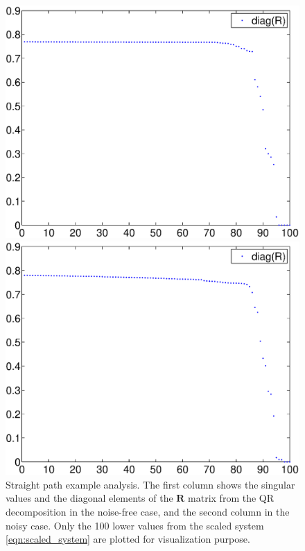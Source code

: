 \begin{figure}[t]
\begin{minipage}{.492\columnwidth}
  \includegraphics[width=\columnwidth]
    {fig/straight-path-noisefree-spqr-scaled.eps}
\end{minipage}
\begin{minipage}{.492\columnwidth}
  \centering
  \includegraphics[width=\columnwidth]
    {fig/straight-path-spqr-scaled.eps}
\end{minipage}
\caption{Straight path example analysis. The first column shows the singular
  values and the diagonal elements of the $\mathbf{R}$ matrix from the QR
  decomposition in the noise-free case, and the second column in the noisy
  case. Only the 100 lower values from the scaled system
  \eqref{eqn:scaled_system} are plotted for visualization purpose.}
\label{fig:straight-path-analysis}
\end{figure}

